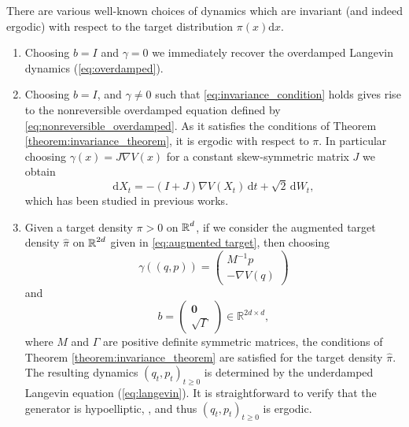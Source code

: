 There are various well-known choices of dynamics which are invariant (and indeed ergodic) with respect to the target distribution $\pi(x)\mathrm{d}x$.
\begin{enumerate}
  \item Choosing  $b = I$ and $\gamma = 0$ we immediately recover the overdamped Langevin dynamics (\ref{eq:overdamped}).
  \item Choosing $b = I$, and $\gamma \neq 0$ such that \eqref{eq:invariance_condition} holds gives rise to the nonreversible overdamped equation defined by \eqref{eq:nonreversible_overdamped}.  As it  satisfies the conditions of Theorem \ref{theorem:invariance_theorem}, it is ergodic with respect to $\pi$.  In particular choosing $\gamma(x) = J\nabla V(x)$ for a constant skew-symmetric matrix $J$ we obtain
  \begin{equation}
  \label{eq:nonrev_overdamped_J}
    \mathrm{d}X_t = -(I + J)\nabla V(X_t)\,\mathrm{d}t + \sqrt{2}\,\mathrm{d}W_t,
  \end{equation}
  which has been studied in previous works.  

  \item Given a target density $\pi > 0$ on $\operatorname{\mathbb{R}}^d$, if we consider the augmented target density $\widehat{\pi}$ on $\operatorname{\mathbb{R}}^{2d}$ given in \eqref{eq:augmented target},
  then choosing
  \begin{equation}
  \label{eq:underdamped_gamma}
    \gamma((q,p)) = \left(\begin{array}{c} M^{-1}p \\ -\nabla V(q)\end{array}\right)
  \end{equation}
  and 
  \begin{equation}
    \label{eq:underdamped_sigma}
    b = \left(\begin{array}{c}\boldsymbol{0} \\ \sqrt{\Gamma}\end{array}\right) \in \mathbb{R}^{2d \times d},
  \end{equation}
  where $M$ and $\Gamma$ are positive definite symmetric matrices, the conditions of Theorem \ref{theorem:invariance_theorem} are satisfied for the target density $\widehat{\pi}$.  The resulting dynamics $(q_t, p_t)_{t\ge0}$ is determined by the underdamped Langevin equation (\ref{eq:langevin}). It is straightforward to verify that the generator is hypoelliptic, \cite[Sec 2.2.3.1]{Free_energy_computations}, and thus $(q_t, p_t)_{t\ge0}$ is ergodic. 


\end{enumerate}
